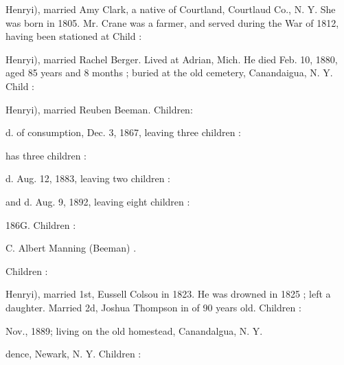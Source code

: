 \documentclass{book}
\begin{document}
Henryi), married Amy Clark, a native of Courtland, Courtlaud 
Co., N. Y. She was born in 1805. Mr. Crane was a farmer, 
and served during the War of 1812, having been stationed at 
Child : 


Henryi), married Rachel Berger. Lived at Adrian, Mich. He 
died Feb. 10, 1880, aged 85 years and 8 months ; buried at the 
old cemetery, Canandaigua, N. Y. Child : 


Henryi), married Reuben Beeman. Children: 














d. of consumption, Dec. 3, 1867, leaving three children : 





has three children : 





d. Aug. 12, 1883, leaving two children : 




and d. Aug. 9, 1892, leaving eight children : 













186G. Children : 






C. Albert Manning (Beeman) . 


Children : 




Henryi), married 1st, Eussell Colsou in 1823. He was drowned 
in 1825 ; left a daughter. Married 2d, Joshua Thompson in 
of 90 years old. Children : 









Nov., 1889; living on the old homestead, Canandalgua, N. Y. 





dence, Newark, N. Y. Children : 
\end{document}
